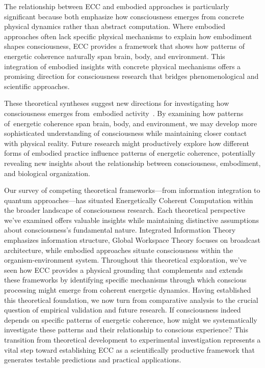 The relationship between ECC and embodied approaches is particularly significant because both emphasize how consciousness emerges from concrete physical dynamics rather than abstract computation. Where embodied approaches often lack specific physical mechanisms to explain how embodiment shapes consciousness, ECC provides a framework that shows how patterns of energetic coherence naturally span brain, body, and environment. This integration of embodied insights with concrete physical mechanisms offers a promising direction for consciousness research that bridges phenomenological and scientific approaches.

These theoretical syntheses suggest new directions for investigating how consciousness emerges from~embodied activity~\cite{Varela1991, varela1996neurophenomenology}. By examining how patterns of~energetic coherence span brain, body, and environment, we may develop more sophisticated understanding of consciousness while maintaining closer contact with physical reality. Future research might productively explore how different forms of embodied practice influence patterns of energetic coherence, potentially revealing new insights about the relationship between consciousness, embodiment, and biological organization.

Our survey of competing theoretical frameworks—from information integration to quantum approaches—has situated Energetically Coherent Computation within the broader landscape of consciousness research. Each theoretical perspective we've examined offers valuable insights while maintaining distinctive assumptions about consciousness's fundamental nature. Integrated Information Theory emphasizes information structure, Global Workspace Theory focuses on broadcast architecture, while embodied approaches situate consciousness within the organism-environment system. Throughout this theoretical exploration, we've seen how ECC provides a physical grounding that complements and extends these frameworks by identifying specific mechanisms through which conscious processing might emerge from coherent energetic dynamics. Having established this theoretical foundation, we now turn from comparative analysis to the crucial question of empirical validation and future research. If consciousness indeed depends on specific patterns of energetic coherence, how might we systematically investigate these patterns and their relationship to conscious experience? This transition from theoretical development to experimental investigation represents a vital step toward establishing ECC as a scientifically productive framework that generates testable predictions and practical applications.
